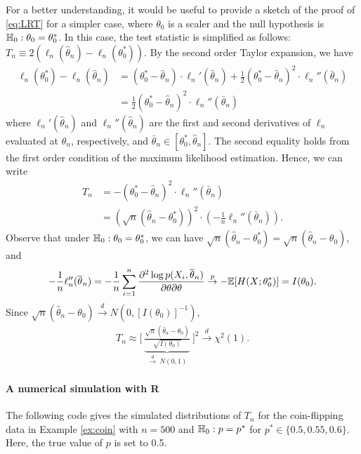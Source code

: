 \documentclass[11pt, A4paper, openany, uplatex]{book}
\begin{document}
For a better understanding, it would be useful to provide a sketch of the proof of \eqref{eq:LRT} for a simpler case, where $\theta_0$ is a scaler and the null hypothesis is $\mathbb{H}_0: \theta_0 = \theta_0^*$.
In this case, the test statistic is simplified as follows: $T_n \equiv 2\left(\ell_n(\hat \theta_n) - \ell_n(\theta_0^*) \right)$.
By the second order Taylor expansion, we have
\begin{align*}
	\ell_n(\theta_0^*) - \ell_n(\hat \theta_n)
	& =  (\theta_0^* - \hat \theta_n) \cdot \ell_n'(\hat \theta_n) + \frac{1}{2}(\theta_0^* - \hat \theta_n)^2 \cdot \ell_n''(\bar \theta_n)\\
	& = \frac{1}{2}(\theta_0^* - \hat \theta_n)^2 \cdot \ell_n''(\bar \theta_n)
\end{align*}
where $\ell_n'(\hat \theta_n)$ and $\ell_n''(\hat \theta_n)$ are the first and second derivatives of $\ell_n$ evaluated at $\hat \theta_n$, respectively, and $\bar \theta_n \in [\theta_0^*, \hat \theta_n]$.
The second equality holds from the first order condition of the maximum likelihood estimation.
Hence, we can write
\begin{align*}
	T_n 
	& = -(\theta_0^* - \hat \theta_n)^2 \cdot \ell_n''(\bar \theta_n)\\
	& =  (\sqrt{n}(\hat \theta_n - \theta_0^*))^2 \cdot \left( - \frac{1}{n}\ell_n''(\bar \theta_n) \right).
\end{align*}
Observe that under $\mathbb{H}_0: \theta_0 = \theta_0^*$, we can have $\sqrt{n}(\hat \theta_n - \theta_0^*) = \sqrt{n}(\hat \theta_n - \theta_0)$, and
\[
	-\frac{1}{n} \ell_n''(\overline \theta_n) = -\frac{1}{n} \sum_{i=1}^n \frac{\partial^2 \log p(X_i, \overline \theta_n)}{\partial \theta \partial \theta} \overset{p}{\to} -\mathbb{E}[H(X; \theta_0^*)] = I(\theta_0).
\]
Since $\sqrt{n}(\hat \theta_n - \theta_0) \overset{d}{\to} N(0, [I(\theta_0)]^{-1})$, 
\begin{align*}
	T_n \approx \Bigg[ \: \underbrace{\frac{\sqrt{n}(\hat \theta_n - \theta_0)}{\sqrt{I(\theta_0)}}}_{\overset{d}{\to} \: N(0,1)} \: \Bigg]^2 \overset{d}{\to} \chi^2(1).
\end{align*}


\paragraph{A numerical simulation with R}
The following code gives the simulated distributions of $T_n$ for the coin-flipping data in Example \ref{ex:coin} with $n = 500$ and $\mathbb{H}_0: p = p^*$ for $p^* \in \{0.5, 0.55, 0.6\}$.
Here, the true value of $p$ is set to 0.5.
\end{document}
